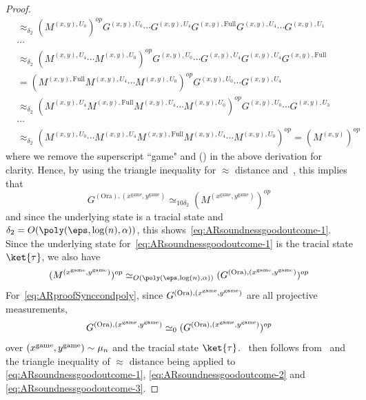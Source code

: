 \begin{proof}
{\begin{align*}
			 &\approx_{\delta_2} (M^{(x, y), U_0})^{op} G^{(x, y),U_0 } \cdots  G^{(x, y), U_4} G^{(x, y), \text{Full}} G^{(x, y),U_4 } \cdots G^{(x, y),U_1 } \\
			 &\cdots \\
			 &\approx_{\delta_2} (M^{(x, y), U_4} \cdots M^{(x, y), U_0})^{op}  G^{ (x, y),U_0 } \cdots  G^{(x, y),U_4 }   G^{(x, y), U_4} G^{(x, y), \text{Full}}  \\
			 &=  (M^{(x, y), \text{Full}} M^{(x, y), U_4} \cdots M^{(x, y), U_0})^{op}  G^{ (x, y),U_0 } \cdots  G^{(x, y),U_4 } \\
			 &\approx_{\delta_2}  (M^{(x, y), U_4} M^{(x, y), \text{Full}} M^{(x, y), U_4} \cdots M^{(x, y), U_0})^{op}  G^{ (x, y),U_0 } \cdots  G^{(x, y),U_3 }  \\
			 &\cdots \\
			 &\approx_{\delta_2}  ( M^{(x, y), U_0} \cdots M^{(x, y), U_4} M^{(x, y), \text{Full}} M^{(x, y), U_4} \cdots M^{(x, y), U_0})^{op}  =  (M^{(x, y)})^{op}
		\end{align*}
	}
	where we remove the superscript ``game" and () in the above derivation for clarity. Hence, by using the triangle inequality for $\approx$ distance and~, this implies that 
	\begin{equation*}
		G^{(\text{Ora}), (x^{\text{game}}, y^{\text{game}})}  \simeq_{10 \delta_2}(M^{(x^{\text{game}}, y^{\text{game}})})^{op}
	\end{equation*}
	and since the underlying state is a tracial state and $\delta_2 = O(\poly(\eps, \log(n), \alpha))$, this shows~\eqref{eq:ARsoundnessgoodoutcome-1}. Since the underlying state for~\eqref{eq:ARsoundnessgoodoutcome-1} is the tracial state $\ket{\tau}$, we also have
	\begin{equation} \label{eq:ARsoundnessgoodoutcome-2}
		(M^{(x^{\text{game}}, y^{\text{game}})})^{op} \simeq_{O(\poly(\eps, \log(n), \alpha))}  (G^{(\text{Ora}), (x^{\game}, y^{\game})})^{op}
	\end{equation}
	For~\eqref{eq:ARproofSynccondpoly}, since $G^{(\text{Ora}), (x^{\text{game}}, y^{\text{game}})} $ are all projective measurements, 
	\begin{equation} \label{eq:ARsoundnessgoodoutcome-3}
		G^{(\text{Ora}), (x^{\text{game}}, y^{\text{game}})} \simeq_0 (	G^{(\text{Ora}), (x^{\text{game}}, y^{\text{game}})})^{op}
	\end{equation}
	over $(x^{\text{game}}, y^{\text{game}}) \sim \mu_n$ and the tracial state $\ket{\tau}$.~ then follows from~ and the triangle inequality of $\approx$ distance being applied to \eqref{eq:ARsoundnessgoodoutcome-1}, \eqref{eq:ARsoundnessgoodoutcome-2} and \eqref{eq:ARsoundnessgoodoutcome-3}. 
	

\end{proof}
